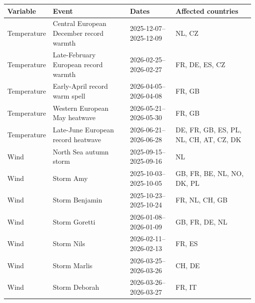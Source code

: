 \begin{tabular}{@{}lllp{5.2cm}@{}}
\toprule
Variable & Event & Dates & Affected countries \\
\midrule
Temperature & Central European December record warmth & 2025-12-07--2025-12-09 & NL, CZ \\\addlinespace[0.2em]
Temperature & Late-February European record warmth & 2026-02-25--2026-02-27 & FR, DE, ES, CZ \\\addlinespace[0.2em]
Temperature & Early-April record warm spell & 2026-04-05--2026-04-08 & FR, GB \\\addlinespace[0.2em]
Temperature & Western European May heatwave & 2026-05-21--2026-05-30 & FR, GB \\\addlinespace[0.2em]
Temperature & Late-June European record heatwave & 2026-06-21--2026-06-28 & DE, FR, GB, ES, PL, NL, CH, AT, CZ, DK \\\addlinespace[0.2em]
Wind & North Sea autumn storm & 2025-09-15--2025-09-16 & NL \\\addlinespace[0.2em]
Wind & Storm Amy & 2025-10-03--2025-10-05 & GB, FR, BE, NL, NO, DK, PL \\\addlinespace[0.2em]
Wind & Storm Benjamin & 2025-10-23--2025-10-24 & FR, NL, CH, GB \\\addlinespace[0.2em]
Wind & Storm Goretti & 2026-01-08--2026-01-09 & GB, FR, DE, NL \\\addlinespace[0.2em]
Wind & Storm Nils & 2026-02-11--2026-02-13 & FR, ES \\\addlinespace[0.2em]
Wind & Storm Marlis & 2026-03-25--2026-03-26 & CH, DE \\\addlinespace[0.2em]
Wind & Storm Deborah & 2026-03-26--2026-03-27 & FR, IT \\
\bottomrule
\end{tabular}
